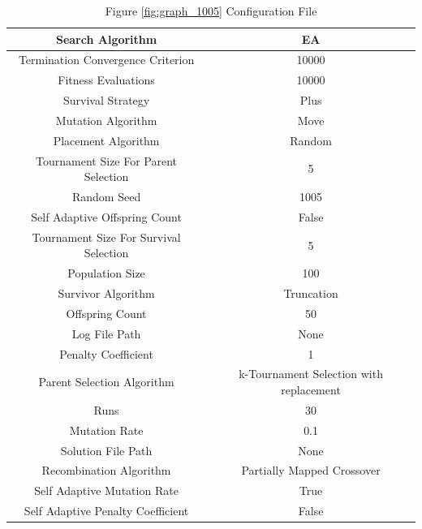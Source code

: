 \documentclass{standalone}
\begin{document}
\begin{table}[!htb]
	\centering
	\caption{Figure \ref{fig:graph_1005} Configuration File}
	\label{tab:graph_1005}
	\begin{tabular}{| c | c |}
		\hline
		Search Algorithm		& EA		 \\
		\hline
		Termination Convergence Criterion		& 10000		 \\
		\hline
		Fitness Evaluations		& 10000		 \\
		\hline
		Survival Strategy		& Plus		 \\
		\hline
		Mutation Algorithm		& Move		 \\
		\hline
		Placement Algorithm		& Random		 \\
		\hline
		Tournament Size For Parent Selection		& 5		 \\
		\hline
		Random Seed		& 1005		 \\
		\hline
		Self Adaptive Offspring Count		& False		 \\
		\hline
		Tournament Size For Survival Selection		& 5		 \\
		\hline
		Population Size		& 100		 \\
		\hline
		Survivor Algorithm		& Truncation		 \\
		\hline
		Offspring Count		& 50		 \\
		\hline
		Log File Path		& None		 \\
		\hline
		Penalty Coefficient		& 1		 \\
		\hline
		Parent Selection Algorithm		& k-Tournament Selection with replacement		 \\
		\hline
		Runs		& 30		 \\
		\hline
		Mutation Rate		& 0.1		 \\
		\hline
		Solution File Path		& None		 \\
		\hline
		Recombination Algorithm		& Partially Mapped Crossover		 \\
		\hline
		Self Adaptive Mutation Rate		& True		 \\
		\hline
		Self Adaptive Penalty Coefficient		& False		 \\
		\hline
	\end{tabular}
\end{table}
\end{document}

